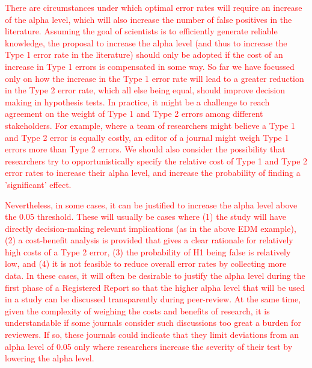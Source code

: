 \documentclass[
  english,
  ,man, a4paper,floatsintext]{apa6}
\begin{document}
\textcolor{red}{There are circumstances under which optimal error rates will require an increase of the alpha level, which will also increase the number of false positives in the literature. Assuming the goal of scientists is to efficiently generate reliable knowledge, the proposal to increase the alpha level (and thus to increase the Type 1 error rate in the literature) should only be adopted if the cost of an increase in Type 1 errors is compensated in some way. So far we have focussed only on how the increase in the Type 1 error rate will lead to a greater reduction in the Type 2 error rate, which all else being equal, should improve decision making in hypothesis tests. In practice, it might be a challenge to reach agreement on the weight of Type 1 and Type 2 errors among different stakeholders. For example, where a team of researchers might believe a Type 1 and Type 2 error is equally costly, an editor of a journal might weigh Type 1 errors more than Type 2 errors. We should also consider the possibility that researchers try to opportunistically specify the relative cost of Type 1 and Type 2 error rates to increase their alpha level, and increase the probability of finding a 'significant' effect.}

\textcolor{red}{Nevertheless, in some cases, it can be justified to increase the alpha level above the 0.05 threshold. These will usually be cases where (1) the study will have directly decision-making relevant implications (as in the above EDM example), (2) a cost-benefit analysis is provided that gives a clear rationale for relatively high costs of a Type 2 error, (3) the probability of H1 being false is relatively low, and (4) it is not feasible to reduce overall error rates by collecting more data. In these cases, it will often be desirable to justify the alpha level during the first phase of a Registered Report so that the higher alpha level that will be used in a study can be discussed transparently during peer-review. At the same time, given the complexity of weighing the costs and benefits of research, it is understandable if some journals consider such discussions too great a burden for reviewers. If so, these journals could indicate that they limit deviations from an alpha level of 0.05 only where researchers increase the severity of their test by lowering the alpha level.}
\end{document}

